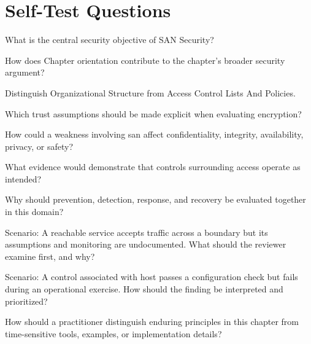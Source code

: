 \documentclass[11pt,letterpaper]{article}
\begin{document}
\section*{Self-Test Questions}
\begin{CornellRecallList}
\item What is the central security objective of SAN Security?
\item How does Chapter orientation contribute to the chapter's broader security argument?
\item Distinguish Organizational Structure from Access Control Lists And Policies.
\item Which trust assumptions should be made explicit when evaluating encryption?
\item How could a weakness involving san affect confidentiality, integrity, availability, privacy, or safety?
\item What evidence would demonstrate that controls surrounding access operate as intended?
\item Why should prevention, detection, response, and recovery be evaluated together in this domain?
\item Scenario: A reachable service accepts traffic across a boundary but its assumptions and monitoring are undocumented. What should the reviewer examine first, and why?
\item Scenario: A control associated with host passes a configuration check but fails during an operational exercise. How should the finding be interpreted and prioritized?
\item How should a practitioner distinguish enduring principles in this chapter from time-sensitive tools, examples, or implementation details?
\end{CornellRecallList}
\end{document}
